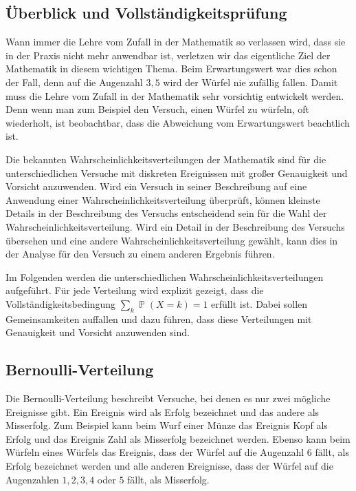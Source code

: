 ﻿\documentclass[12pt,a4paper]{article}
\theoremstyle{definition}
\theoremstyle{plain}
\theoremstyle{remark}
\DeclareMathOperator{\Prob}{\mathbb{P}}
\begin{document}
\subsection{Überblick und Vollständigkeitsprüfung}

Wann immer die Lehre vom Zufall in der Mathematik so verlassen wird, dass sie
in der Praxis nicht mehr anwendbar ist, verletzen wir das eigentliche Ziel der
Mathematik in diesem wichtigen Thema. Beim Erwartungswert war dies schon der
Fall, denn auf die Augenzahl $3{,}5$ wird der Würfel nie zufällig fallen.
Damit muss die Lehre vom Zufall in der Mathematik sehr vorsichtig entwickelt
werden. Denn wenn man zum Beispiel den Versuch, einen Würfel zu würfeln, oft
wiederholt, ist beobachtbar, dass die Abweichung vom Erwartungswert beachtlich
ist.

Die bekannten Wahrscheinlichkeitsverteilungen der Mathematik sind für die
unterschiedlichen Versuche mit diskreten Ereignissen mit großer Genauigkeit
und Vorsicht anzuwenden. Wird ein Versuch in seiner Beschreibung auf eine
Anwendung einer Wahrscheinlichkeitsverteilung überprüft, können kleinste
Details in der Beschreibung des Versuchs entscheidend sein für die Wahl der
Wahrscheinlichkeitsverteilung. Wird ein Detail in der Beschreibung des
Versuchs übersehen und eine andere Wahrscheinlichkeitsverteilung gewählt,
kann dies in der Analyse für den Versuch zu einem anderen Ergebnis führen.

Im Folgenden werden die unterschiedlichen Wahrscheinlichkeitsverteilungen
aufgeführt. Für jede Verteilung wird explizit gezeigt, dass die
Vollständigkeitsbedingung $\sum_k \Prob(X=k) = 1$ erfüllt ist. Dabei sollen
Gemeinsamkeiten auffallen und dazu führen, dass diese Verteilungen mit
Genauigkeit und Vorsicht anzuwenden sind.

\subsection{Bernoulli-Verteilung}

Die Bernoulli-Verteilung beschreibt Versuche, bei denen es nur zwei mögliche
Ereignisse gibt. Ein Ereignis wird als Erfolg bezeichnet und das andere als
Misserfolg. Zum Beispiel kann beim Wurf einer Münze das Ereignis Kopf als
Erfolg und das Ereignis Zahl als Misserfolg bezeichnet werden. Ebenso kann
beim Würfeln eines Würfels das Ereignis, dass der Würfel auf die Augenzahl
$6$ fällt, als Erfolg bezeichnet werden und alle anderen Ereignisse, dass der
Würfel auf die Augenzahlen $1, 2, 3, 4$ oder $5$ fällt, als Misserfolg.
\end{document}
